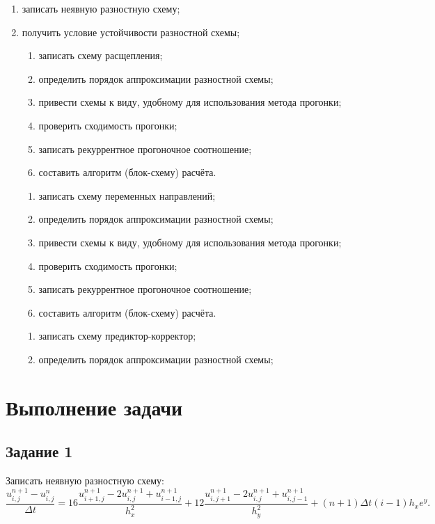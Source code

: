 \documentclass[12pt, a4paper]{report}
\begin{document}
	\begin{enumerate}
		\item записать неявную разностную схему;
		\item получить условие устойчивости разностной схемы;
		\begin{enumerate}
			\item записать схему расщепления;
			\item определить порядок аппроксимации разностной схемы;
			\item привести схемы к виду, удобному для использования метода прогонки;
			\item проверить сходимость прогонки;
			\item записать рекуррентное прогоночное соотношение;
			\item составить алгоритм (блок-схему) расчёта.
		\end{enumerate}
		\begin{enumerate}
			\item записать схему переменных направлений;
			\item определить порядок аппроксимации разностной схемы;
			\item привести схемы к виду, удобному для использования метода прогонки;
			\item проверить сходимость прогонки;
			\item записать рекуррентное прогоночное соотношение;
			\item составить алгоритм (блок-схему) расчёта.
		\end{enumerate}
		\begin{enumerate}
			\item записать схему предиктор-корректор;
			\item определить порядок аппроксимации разностной схемы;
		\end{enumerate}
	\end{enumerate}

	\newpage

	\section*{Выполнение задачи}

	\subsection*{Задание 1}
	\large
	Записать неявную разностную схему:
	\small
	\begin{equation}\label{eq:implicit}
		\frac{u_{i, j}^{n+1} - u_{i, j}^{n}}{\Delta t} = 16\frac{u_{i+1, j}^{n+1} - 2u_{i, j}^{n+1} + u_{i-1, j}^{n+1}}{h_{x}^{2}} + 12\frac{u_{i, j+1}^{n+1} - 2u_{i, j}^{n+1} + u_{i, j-1}^{n+1}}{h_{y}^{2}} + (n+1)\Delta t(i-1)h_{x}e^{y}.
	\end{equation}
\end{document}
